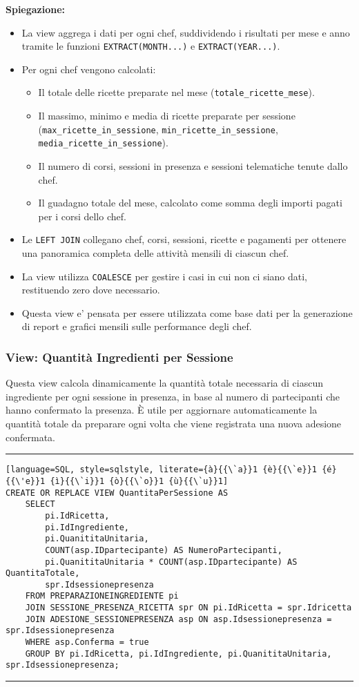 \textbf{Spiegazione:}
\begin{itemize}
    \item La view aggrega i dati per ogni chef, suddividendo i risultati per mese e anno tramite le funzioni \texttt{EXTRACT(MONTH...)} e \texttt{EXTRACT(YEAR...)}.
    \item Per ogni chef vengono calcolati:
    \begin{itemize}
        \item Il totale delle ricette preparate nel mese (\texttt{totale\_ricette\_mese}).
        \item Il massimo, minimo e media di ricette preparate per sessione (\texttt{max\_ricette\_in\_sessione}, \texttt{min\_ricette\_in\_sessione}, \texttt{media\_ricette\_in\_sessione}).
        \item Il numero di corsi, sessioni in presenza e sessioni telematiche tenute dallo chef.
        \item Il guadagno totale del mese, calcolato come somma degli importi pagati per i corsi dello chef.
    \end{itemize}
    \item Le \texttt{LEFT JOIN} collegano chef, corsi, sessioni, ricette e pagamenti per ottenere una panoramica completa delle attività mensili di ciascun chef.
    \item La view utilizza \texttt{COALESCE} per gestire i casi in cui non ci siano dati, restituendo zero dove necessario.
    \item Questa view e' pensata per essere utilizzata come base dati per la generazione di report e grafici mensili sulle performance degli chef.
\end{itemize}

\subsubsection{View: Quantità Ingredienti per Sessione}

Questa view calcola dinamicamente la quantità totale necessaria di ciascun ingrediente per ogni sessione in presenza, in base al numero di partecipanti che hanno confermato la presenza. È utile per aggiornare automaticamente la quantità totale da preparare ogni volta che viene registrata una nuova adesione confermata.

\noindent\rule{\textwidth}{0.4pt}
\begin{lstlisting}[language=SQL, style=sqlstyle, literate={à}{{\`a}}1 {è}{{\`e}}1 {é}{{\'e}}1 {ì}{{\`i}}1 {ò}{{\`o}}1 {ù}{{\`u}}1]
CREATE OR REPLACE VIEW QuantitaPerSessione AS
    SELECT 
        pi.IdRicetta,
        pi.IdIngrediente,
        pi.QuanititaUnitaria,
        COUNT(asp.IDpartecipante) AS NumeroPartecipanti,
        pi.QuanititaUnitaria * COUNT(asp.IDpartecipante) AS QuantitaTotale,
        spr.Idsessionepresenza
    FROM PREPARAZIONEINGREDIENTE pi
    JOIN SESSIONE_PRESENZA_RICETTA spr ON pi.IdRicetta = spr.Idricetta
    JOIN ADESIONE_SESSIONEPRESENZA asp ON asp.Idsessionepresenza = spr.Idsessionepresenza
    WHERE asp.Conferma = true
    GROUP BY pi.IdRicetta, pi.IdIngrediente, pi.QuanititaUnitaria, spr.Idsessionepresenza;
\end{lstlisting}
\noindent\rule{\textwidth}{0.4pt}

